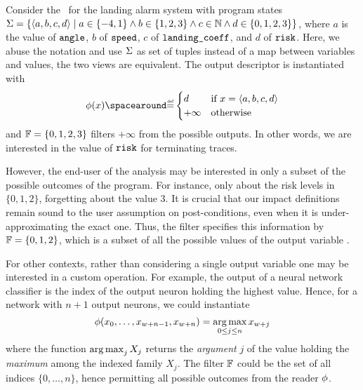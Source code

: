 \begin{example}
  Consider the~ for the landing alarm system with program states $\Sigma=\{\langle a, b, c, d \rangle \mid a\in\{-4,1\}\land b\in\{1,2,3\}\land c\in\mathbb{N} \land d\in\{0,1,2,3\}\}$, where $a$ is the value of $\texttt{angle}$, $b$ of $\texttt{speed}$, $c$ of $\texttt{landing\_coeff}$, and $d$ of $\texttt{risk}$.
  Here, we abuse the notation and use $\Sigma$ as set of tuples instead of a map between variables and values, the two views are equivalent.
  The output descriptor is instantiated with
  \[
  \reader(x) \DefeQ \begin{cases}
    d & \text{if } x = \langle a, b, c, d \rangle \\
    +\infty & \text{otherwise}
  \end{cases}
  \]
  and $\mathbb{F}=\{0,1,2,3\}$ filters $+\infty$ from the possible outputs.
  In other words, we are interested in the value of $\texttt{risk}$ for terminating traces.

  However, the end-user of the analysis may be interested in only a subset of the possible outcomes of the program.
  For instance, only about the risk levels in $\{0, 1, 2\}$, forgetting about the value $3$.
  It is crucial that our impact definitions remain sound to the user assumption on post-conditions, even when it is under-approximating the exact one.
  Thus, the filter specifies this information by $\mathbb{F}=\{0, 1, 2\}$, which is a subset of all the possible values of the output variable \z.
\end{example}

\begin{example}
  For other contexts, rather than considering a single output variable one may be interested in a custom operation.
  For example, the output of a neural network classifier is the index of the output neuron holding the highest value.
  Hence, for a network with $n+1$ output neurons, we could instantiate
  \[
    \phi(x_0,\dots,x_{w+n-1},x_{w+n})=\operatorname*{arg\,max}_{0\le j\le n} x_{w+j}
  \] where the function $\operatorname*{arg\,max}_j X_j$ returns the \textit{argument} $j$ of the value holding the \textit{maximum} among the indexed family $X_j$.
  The filter $\mathbb{F}$ could be the set of all indices $\{0,\dots,n\}$, hence permitting all possible outcomes from the reader $\phi$.
\end{example}



